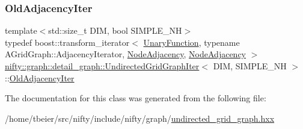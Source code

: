 \mbox{\label{classnifty_1_1graph_1_1detail__graph_1_1UndirectedGridGraphIter_a0b2569d896d215175b54ed1f439ad5a5}} 
\subsubsection{\texorpdfstring{Old\+Adjacency\+Iter}{OldAdjacencyIter}}
{\footnotesize\ttfamily template$<$std\+::size\+\_\+t D\+IM, bool S\+I\+M\+P\+L\+E\+\_\+\+NH$>$ \\
typedef boost\+::transform\+\_\+iterator$<$ \hyperlink{structnifty_1_1graph_1_1detail__graph_1_1UndirectedGridGraphIter_1_1UnaryFunction}{Unary\+Function}, typename A\+Grid\+Graph\+::\+Adjacency\+Iterator, \hyperlink{classnifty_1_1graph_1_1detail__graph_1_1UndirectedGridGraphIter_ab102d464df39aae71f7482baa37d8966}{Node\+Adjacency}, \hyperlink{classnifty_1_1graph_1_1detail__graph_1_1UndirectedGridGraphIter_ab102d464df39aae71f7482baa37d8966}{Node\+Adjacency} $>$ \hyperlink{classnifty_1_1graph_1_1detail__graph_1_1UndirectedGridGraphIter}{nifty\+::graph\+::detail\+\_\+graph\+::\+Undirected\+Grid\+Graph\+Iter}$<$ D\+IM, S\+I\+M\+P\+L\+E\+\_\+\+NH $>$\+::\hyperlink{classnifty_1_1graph_1_1detail__graph_1_1UndirectedGridGraphIter_a0b2569d896d215175b54ed1f439ad5a5}{Old\+Adjacency\+Iter}}



The documentation for this class was generated from the following file\+:\begin{DoxyCompactItemize}
\item 
/home/tbeier/src/nifty/include/nifty/graph/\hyperlink{graph_2undirected__grid__graph_8hxx}{undirected\+\_\+grid\+\_\+graph.\+hxx}\end{DoxyCompactItemize}
